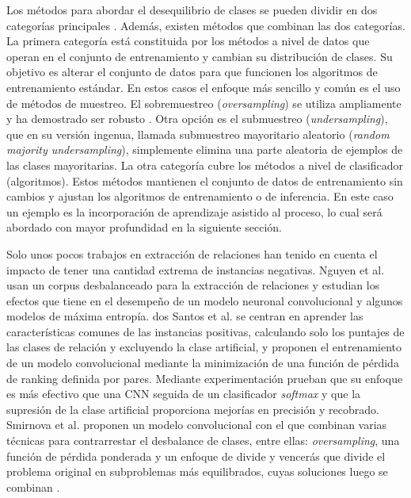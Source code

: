 
Los métodos para abordar el desequilibrio de clases se pueden dividir en dos categorías principales \cite{huang2021LearningFC}. Además, existen métodos que combinan las dos categorías. La primera categoría está constituida por los métodos a nivel de datos que operan en el conjunto de entrenamiento y cambian su distribución de clases. Su objetivo es alterar el conjunto de datos para que funcionen los algoritmos de entrenamiento estándar. En estos casos el enfoque más sencillo y común es el uso de métodos de muestreo. El sobremuestreo (\textit{oversampling}) se utiliza ampliamente y ha demostrado ser robusto \cite{ling1998data}. Otra opción es el submuestreo (\textit{undersampling}), que en su versión ingenua, llamada submuestreo mayoritario aleatorio (\textit{random majority undersampling}), simplemente elimina una parte aleatoria de ejemplos de las clases mayoritarias. La otra categoría cubre los métodos a nivel de clasificador (algoritmos). Estos métodos mantienen el conjunto de datos de entrenamiento sin cambios y ajustan los algoritmos de entrenamiento o de inferencia. En este caso un ejemplo es la incorporación de aprendizaje asistido al proceso, lo cual será abordado con mayor profundidad en la siguiente sección. 

Solo unos pocos trabajos en extracción de relaciones han tenido en cuenta el impacto de tener una cantidad extrema de instancias negativas. Nguyen et al. \cite{nguyen2015relation} usan un corpus desbalanceado para la extracción de relaciones y estudian los efectos que tiene en el desempeño de un modelo neuronal convolucional y algunos modelos de máxima entropía. dos Santos et al. \cite{santos2015classifying} se centran en aprender las características comunes de las instancias positivas, calculando solo los puntajes de las clases de relación y excluyendo la clase artificial, y proponen el entrenamiento de un modelo convolucional mediante la minimización de una función de pérdida de ranking definida por pares. Mediante experimentación prueban que su enfoque es más efectivo que una CNN seguida de un clasificador \textit{softmax} y que la supresión de la clase artificial proporciona mejorías en precisión y recobrado. Smirnova et al. \cite{smirnova2019apcnn} proponen un modelo convolucional con el que combinan varias técnicas para contrarrestar el desbalance de clases, entre ellas:  \textit{oversampling}, una función de pérdida ponderada \cite{sun2007cost} y un enfoque de divide y vencerás que divide el problema original en subproblemas más equilibrados, cuyas soluciones luego se combinan \cite{barandela2003new}.  


